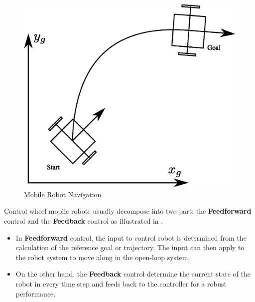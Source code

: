 \begin{figure}[ht]
	\centering
	\includegraphics[scale=0.8]{images/imagess/2lit-MRNav.eps} 
	\caption{Mobile Robot Navigation}
	\label{fig:Mobile Robot Navigation}
\end{figure}

\hspace{1.27cm}
Control wheel mobile robots usually decompose into two part: the \textbf{Feedforward} control and the \textbf{Feedback} control as illustrated in \textbf{\figureautorefname{ \ref{fig:Simple Feedforward and Feedback control}}}.
\begin{itemize}
    \item In \textbf{Feedforward} control, the input to control robot is determined from the calculation of the reference goal or trajectory. The input can then apply to the robot system to move along in the open-loop system.
    \item On the other hand, the \textbf{Feedback} control determine the current state of the robot in every time step and feeds back to the controller for a robust performance.
\end{itemize}
\par

